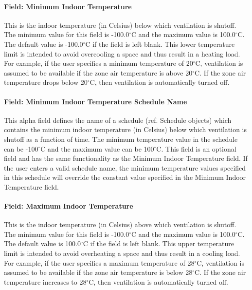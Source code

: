 \paragraph{Field: Minimum Indoor Temperature}\label{field-minimum-indoor-temperature-1}

This is the indoor temperature (in Celsius) below which ventilation is shutoff. The minimum value for this field is -100.0$^\circ$C and the maximum value is 100.0$^\circ$C. The default value is -100.0$^\circ$C if the field is left blank. This lower temperature limit is intended to avoid overcooling a space and thus result in a heating load. For example, if the user specifies a minimum temperature of 20$^\circ$C, ventilation is assumed to be available if the zone air temperature is above 20$^\circ$C. If the zone air temperature drops below 20$^\circ$C, then ventilation is automatically turned off.

\paragraph{Field: Minimum Indoor Temperature Schedule Name}\label{field-minimum-indoor-temperature-schedule-name-1}

This alpha field defines the name of a schedule (ref. Schedule objects) which contains the minimum indoor temperature (in Celsius) below which ventilation is shutoff as a function of time. The minimum temperature value in the schedule can be -100$^\circ$C and the maximum value can be 100$^\circ$C. This field is an optional field and has the same functionality as the Minimum Indoor Temperature field. If the user enters a valid schedule name, the minimum temperature values specified in this schedule will override the constant value specified in the Minimum Indoor Temperature field.

\paragraph{Field: Maximum Indoor Temperature}\label{field-maximum-indoor-temperature-1}

This is the indoor temperature (in Celsius) above which ventilation is shutoff. The minimum value for this field is -100.0$^\circ$C and the maximum value is 100.0$^\circ$C. The default value is 100.0$^\circ$C if the field is left blank. This upper temperature limit is intended to avoid overheating a space and thus result in a cooling load. For example, if the user specifies a maximum temperature of 28$^\circ$C, ventilation is assumed to be available if the zone air temperature is below 28$^\circ$C. If the zone air temperature increases to 28$^\circ$C, then ventilation is automatically turned off.

